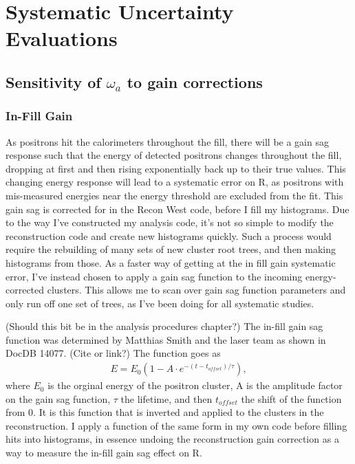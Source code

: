 \graphicspath{ {Figures/Pileup/Multiplier/} {Figures/Pileup/Phase/} {Figures/RandomSeeds/FitStartScans/} {Figures/RandomSeeds/FitIterations/} {Figures/Miscellaneous/} {Figures/CBO/Shape/} {Figures/CBO/LifetimeScan/} {Figures/Gain/InFill/} }

\chapter{Systematic Uncertainty Evaluations}

\section{Sensitivity of \texorpdfstring{$\omega_{a}$}{} to gain corrections}

	\subsection{In-Fill Gain}

		As positrons hit the calorimeters throughout the fill, there will be a gain sag response such that the energy of detected positrons changes throughout the fill, dropping at first and then rising exponentially back up to their true values. This changing energy response will lead to a systematic error on R, as positrons with mis-measured energies near the energy threshold are excluded from the fit. This gain sag is corrected for in the Recon West code, before I fill my histograms. Due to the way I've constructed my analysis code, it's not so simple to modify the reconstruction code and create new histograms quickly. Such a process would require the rebuilding of many sets of new cluster root trees, and then making histograms from those. As a faster way of getting at the in fill gain systematic error, I've instead chosen to apply a gain sag function to the incoming energy-corrected clusters. This allows me to scan over gain sag function parameters and only run off one set of trees, as I've been doing for all systematic studies.

		(Should this bit be in the analysis procedures chapter?) The in-fill gain sag function was determined by Matthias Smith and the laser team as shown in DocDB 14077. (Cite or link?) The function goes as  
			\begin{gather}
				E = E_{0}(1 - A \cdot e^{-(t-t_{offset})/\tau}),
			\label{Eqn:GainSag}
			\end{gather}
		where $E_{0}$ is the orginal energy of the positron cluster, A is the amplitude factor on the gain sag function, $\tau$ the lifetime, and then $t_{offset}$ the shift of the function from 0. It is this function that is inverted and applied to the clusters in the reconstruction. I apply a function of the same form in my own code before filling hits into histograms, in essence undoing the reconstruction gain correction as a way to measure the in-fill gain sag effect on R.

